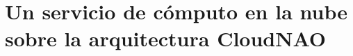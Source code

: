 \documentclass[letterpaper,12pt,spanish]{report}
\begin{document}

\chapter{Un servicio de cómputo en la nube sobre la arquitectura CloudNAO}
\label{\detokenize{chapter_three:un-servicio-de-computo-en-la-nube-sobre-la-arquitectura-cloudnao}}
\label{\detokenize{chapter_three::doc}}






\end{document}
